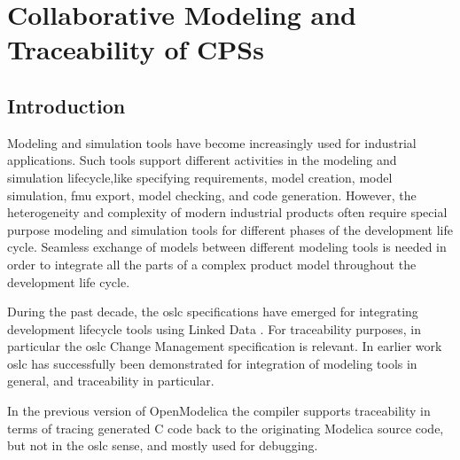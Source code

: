 

\chapter{Collaborative Modeling and Traceability of CPSs}
\label{cha:traceability}


\section{Introduction}
\label{sec:tracaebilityintroduction}


Modeling and simulation tools have become increasingly used for industrial applications. Such tools support different 
activities in the modeling and simulation lifecycle,like specifying requirements, model creation, model simulation, \acrshort{fmu} 
export, model checking, and code generation. However, the heterogeneity and complexity of modern industrial products often require special purpose modeling and simulation tools for different phases of the development life cycle. Seamless exchange of models between different modeling tools
is needed in order to integrate all the parts of a complex product model throughout the development life cycle. 

During the past decade, the \acrshort{oslc} specifications\cite{oslc} 
have emerged for integrating development lifecycle tools using Linked Data \cite{linkeddatatom,linkeddata,linkeddatatim}. For traceability purposes, in particular the \acrshort{oslc} Change Management specification is relevant. In earlier work \cite{oslcelaasar} \acrshort{oslc} has successfully been demonstrated for integration of modeling tools in general, and traceability in particular. 

In the previous version of OpenModelica \cite{debugingpop} the compiler supports traceability in terms of tracing 
generated C code back to the originating Modelica source code, but not in the \acrshort{oslc} sense, and mostly used for debugging. 

